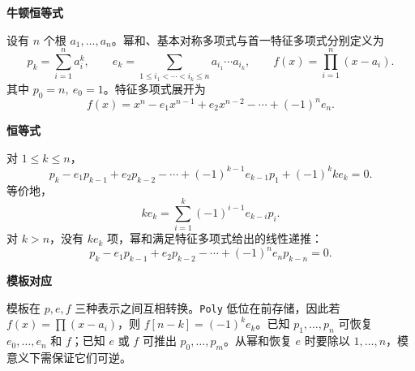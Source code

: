 \textbf{牛顿恒等式}

设有 $n$ 个根 $a_1,\dots,a_n$。幂和、基本对称多项式与首一特征多项式分别定义为
\[
p_k=\sum_{i=1}^{n}a_i^k,\qquad
e_k=\sum_{1\le i_1<\cdots<i_k\le n}a_{i_1}\cdots a_{i_k},\qquad
f(x)=\prod_{i=1}^{n}(x-a_i).
\]
其中 $p_0=n,\ e_0=1$。特征多项式展开为
\[
f(x)=x^n-e_1x^{n-1}+e_2x^{n-2}-\cdots+(-1)^ne_n.
\]

\textbf{恒等式}

对 $1\le k\le n$，
\[
p_k-e_1p_{k-1}+e_2p_{k-2}-\cdots+(-1)^{k-1}e_{k-1}p_1+(-1)^k k e_k=0.
\]
等价地，
\[
k e_k=\sum_{i=1}^{k}(-1)^{i-1}e_{k-i}p_i.
\]
对 $k>n$，没有 $k e_k$ 项，幂和满足特征多项式给出的线性递推：
\[
p_k-e_1p_{k-1}+e_2p_{k-2}-\cdots+(-1)^ne_np_{k-n}=0.
\]

\textbf{模板对应}

模板在 $p,e,f$ 三种表示之间互相转换。\texttt{Poly} 低位在前存储，因此若 $f(x)=\prod(x-a_i)$，则 $f[n-k]=(-1)^ke_k$。已知 $p_1,\dots,p_n$ 可恢复 $e_0,\dots,e_n$ 和 $f$；已知 $e$ 或 $f$ 可推出 $p_0,\dots,p_m$。从幂和恢复 $e$ 时要除以 $1,\dots,n$，模意义下需保证它们可逆。
